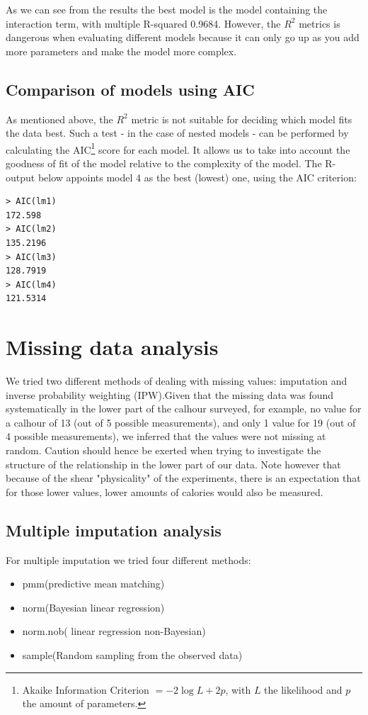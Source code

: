 \documentclass[11pt, a4paper]{article}
\begin{document}
As we can see from the results the best model is the model containing
the interaction term, with multiple R-squared 0.9684. However, the
$R^2$ metrics is dangerous when evaluating different models because it
can only go up as you add more parameters and make the model more
complex.

\subsection{Comparison of models using AIC}

As mentioned above, the $R^2$ metric is not suitable for deciding
which model fits the data best. Such a test - in the case of nested
models - can be performed by calculating the AIC\footnote{Akaike
  Information Criterion $=-2 \log L+2p$, with $L$ the likelihood and
  $p$ the amount of parameters.} score for each model. It allows us to
take into account the goodness of fit of the model relative to the
complexity of the model. The R-output below appoints model 4 as the
best (lowest) one, using the AIC criterion:

\begin{verbatim}
> AIC(lm1)
172.598
> AIC(lm2)
135.2196
> AIC(lm3)
128.7919
> AIC(lm4)
121.5314
\end{verbatim}

\section{Missing data analysis}
We tried two different methods of dealing with missing values:
imputation and inverse probability weighting (IPW).Given that the
missing data was found systematically in the lower part of the calhour
surveyed, for example, no value for a calhour of 13 (out of 5 possible
measurements), and only 1 value for 19 (out of 4 possible
measurements), we inferred that the values were not missing at
random. Caution should hence be exerted when trying to investigate the
structure of the relationship in the lower part of our data. Note
however that because of the shear "physicality" of the experiments,
there is an expectation that for those lower values, lower amounts of
calories would also be measured.

\subsection{Multiple imputation analysis}
For multiple imputation we tried four different methods:
\begin{itemize}
    \item pmm(predictive mean matching)
    \item norm(Bayesian linear regression)
    \item norm.nob( linear regression non-Bayesian)
    \item sample(Random sampling from the observed data)
\end{itemize}
\end{document}
